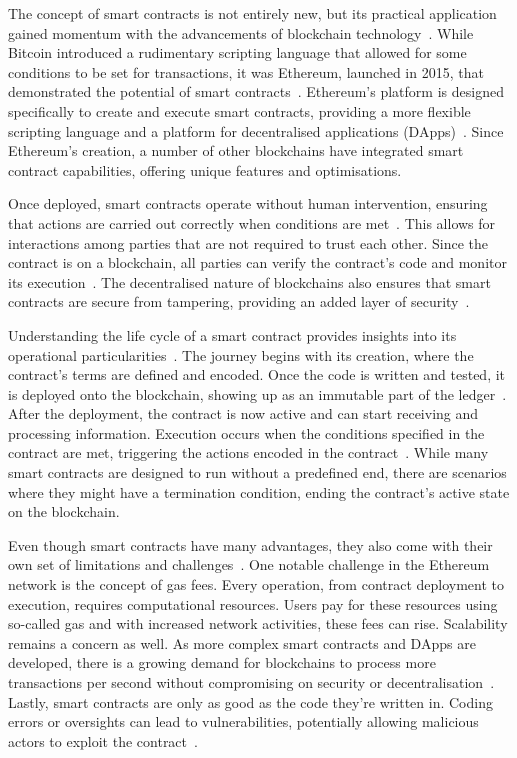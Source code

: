 The concept of smart contracts is not entirely new, but its practical application gained momentum with the advancements of blockchain technology~\cite{Pierro.}. While Bitcoin introduced a rudimentary scripting language that allowed for some conditions to be set for transactions, it was Ethereum, launched in 2015, that demonstrated the potential of smart contracts~\cite{Pierro.}. Ethereum's platform is designed specifically to create and execute smart contracts, providing a more flexible scripting language and a platform for decentralised applications (DApps)~\cite{Pierro.}. Since Ethereum's creation, a number of other blockchains have integrated smart contract capabilities, offering unique features and optimisations.

Once deployed, smart contracts operate without human intervention, ensuring that actions are carried out correctly when conditions are met~\cite{UchaniGutierrez.2023}. This allows for interactions among parties that are not required to trust each other. Since the contract is on a blockchain, all parties can verify the contract's code and monitor its execution~\cite{UchaniGutierrez.2023}. The decentralised nature of blockchains also ensures that smart contracts are secure from tampering, providing an added layer of security~\cite{Zhou.2022}.

Understanding the life cycle of a smart contract provides insights into its operational particularities~\cite{Pierro.}. The journey begins with its creation, where the contract's terms are defined and encoded. Once the code is written and tested, it is deployed onto the blockchain, showing up as an immutable part of the ledger~\cite{Pierro.}. After the deployment, the contract is now active and can start receiving and processing information. Execution occurs when the conditions specified in the contract are met, triggering the actions encoded in the contract~\cite{Pierro.}. While many smart contracts are designed to run without a predefined end, there are scenarios where they might have a termination condition, ending the contract's active state on the blockchain.

Even though smart contracts have many advantages, they also come with their own set of limitations and challenges~\cite{.2019}. One notable challenge in the Ethereum network is the concept of gas fees. Every operation, from contract deployment to execution, requires computational resources. Users pay for these resources using so-called gas and with increased network activities, these fees can rise. Scalability remains a concern as well. As more complex smart contracts and DApps are developed, there is a growing demand for blockchains to process more transactions per second without compromising on security or decentralisation~\cite{.2019}. Lastly, smart contracts are only as good as the code they're written in. Coding errors or oversights can lead to vulnerabilities, potentially allowing malicious actors to exploit the contract~\cite{Zhou.2022}.

